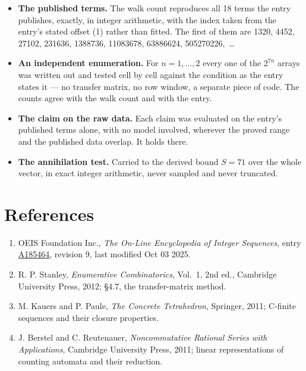 \documentclass[11pt]{article}
\theoremstyle{definition}
\begin{document}
\begin{itemize}

\item {\bfseries The published terms.} The walk count reproduces all 18 terms the entry publishes, exactly, in integer arithmetic, with the index taken from the entry's stated offset (1) rather than fitted. The first of them are 1320, 4452, 27102, 231636, 1388736, 11083678, 63886624, 505270226,~\dots

\item {\bfseries An independent enumeration.} For $n = 1,\dots,2$ every one of the $2^{7n}$ arrays was written out and tested cell by cell against the condition as the entry states it --- no transfer matrix, no row window, a separate piece of code. The counts agree with the walk count and with the entry.

\item {\bfseries The claim on the raw data.} Each claim was evaluated on the entry's published terms alone, with no model involved, wherever the proved range and the published data overlap. It holds there.

\item {\bfseries The annihilation test.} Carried to the derived bound $S = 71$ over the whole vector, in exact integer arithmetic, never sampled and never truncated.

\end{itemize}

\section{References}

\begin{enumerate}

\item OEIS Foundation Inc., \emph{The On-Line Encyclopedia of Integer Sequences}, entry \href{https://oeis.org/A185464}{A185464}, revision 9, last modified Oct 03 2025.

\item R. P. Stanley, \emph{Enumerative Combinatorics}, Vol.~1, 2nd ed., Cambridge University Press, 2012; \S4.7, the transfer-matrix method.

\item M. Kauers and P. Paule, \emph{The Concrete Tetrahedron}, Springer, 2011; C-finite sequences and their closure properties.

\item J. Berstel and C. Reutenauer, \emph{Noncommutative Rational Series with Applications}, Cambridge University Press, 2011; linear representations of counting automata and their reduction.

\end{enumerate}
\end{document}
